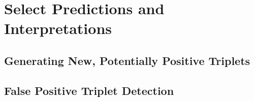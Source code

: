 \chapter{Select Predictions and Interpretations}\label{ch:select-predictions-and-interpretations}


\section{Generating New, Potentially Positive Triplets}\label{sec:generating-new-potentially-positive-triplets}


\section{False Positive Triplet Detection}



